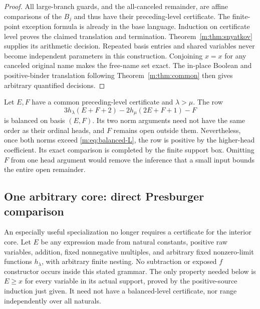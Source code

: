 \begin{proof}
All large-branch guards, and the all-canceled remainder, are affine
comparisons of the $B_j$ and thus have their preceding-level certificate.
The finite-point exception formula is already in the base language.
Induction on certificate level proves the claimed translation and
termination. Theorem~\ref{m:thm:snyatkov} supplies its arithmetic decision.
Repeated basis entries and shared variables never become independent
parameters in this construction.
Conjoining $x=x$ for any canceled original name makes the free-name
set exact.  The in-place Boolean and positive-binder translation following
Theorem~\ref{m:thm:common} then gives arbitrary quantified decisions.
\end{proof}

\begin{example}
Let $E,F$ have a common preceding-level certificate and $\lambda>\mu$.
The row
\[
 3h_\lambda(E+F+2)-2h_\mu(2E+F+1)-F
\]
is balanced on basis $(E,F)$. Its two norm arguments need not have the
same order as their ordinal heads, and $F$ remains open outside them.
Nevertheless, once both norms exceed \eqref{m:eq:balanced-L}, the row is
positive by the higher-head coefficient. Its exact comparison is completed
by the finite support box. Omitting $F$ from one head argument would
remove the inference that a small input bounds the entire open remainder.
\end{example}

\subsection{One arbitrary core: direct Presburger comparison}
An especially useful specialization no longer requires a certificate for the
interior core. Let $E$ be any expression made from natural constants,
positive raw variables, addition, fixed nonnegative multiples, and arbitrary
fixed nonzero-limit functions $h_\lambda$, with arbitrary finite nesting.
No subtraction or exposed $f$ constructor occurs inside this stated grammar.
The only property needed below is $E\ge x$ for every variable in its actual
support, proved by the positive-source induction just given. It need not
have a balanced-level certificate, nor range independently over all naturals.

